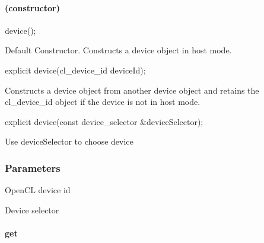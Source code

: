 \documentclass[letterpaper,10pt,english]{sphinxmanual}
\begin{document}
\paragraph{(constructor)}
\label{\detokenize{programming-interface/runtime/device:constructor}}\begin{sphinxalltt}
device();                                                \begin{footnote}[4]\sphinxAtStartFootnote
Default Constructor. Constructs a device object in host
mode.
\end{footnote}
\end{sphinxalltt}
\begin{sphinxalltt}
explicit device(cl\_device\_id deviceId);                  \begin{footnote}[5]\sphinxAtStartFootnote
Constructs a device object from another device object and
retains the cl\_device\_id object if the device is not in
host mode.
\end{footnote}
\end{sphinxalltt}
\begin{sphinxalltt}
explicit device(const device\_selector \&deviceSelector);  \begin{footnote}[6]\sphinxAtStartFootnote
Use deviceSelector to choose device
\end{footnote}
\end{sphinxalltt}
\subsubsection*{Parameters}

\begin{DUlineblock}{0em}
\item[]  \sphinxhyphen{} OpenCL device id
\item[]  \sphinxhyphen{} Device selector
\end{DUlineblock}


\paragraph{get}
\label{\detokenize{programming-interface/runtime/device:get}}
\begin{sphinxVerbatim}[commandchars=\\\{\}]
  
\end{sphinxVerbatim}
\end{document}
